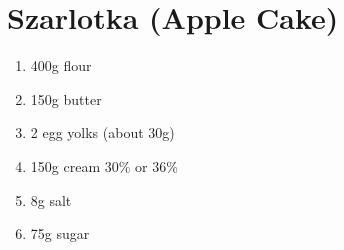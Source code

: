 \section{Szarlotka (Apple Cake)}
\begin{enumerate}
  \item 400g flour
  \item 150g butter
  \item 2 egg yolks (about 30g)
  \item 150g cream 30\% or 36\%
  \item 8g salt
  \item 75g sugar
\end{enumerate}
